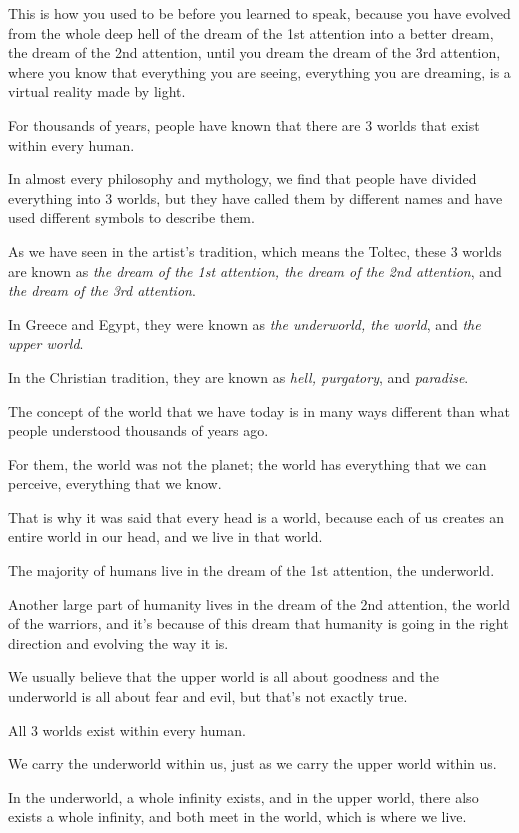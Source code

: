 \documentclass{article}
\numberwithin{equation}{section}
\begin{document}
This is how you used to be before you learned to speak, because you have evolved from the whole deep hell of the dream of the 1st attention into a better dream, the dream of the 2nd attention, until you dream the dream of the 3rd attention, where you know that everything you are seeing, everything you are dreaming, is a virtual reality made by light.

%
For thousands of years, people have known that there are 3 worlds that exist within every human.

In almost every philosophy and mythology, we find that people have divided everything into 3 worlds, but they have called them by different names and have used different symbols to describe them.

As we have seen  in the artist's tradition, which means the Toltec, these 3 worlds are known as \textit{the dream of the 1st attention, the dream of the 2nd attention}, and \textit{the dream of the 3rd attention}.

In Greece and Egypt, they were known as \textit{the underworld, the world}, and \textit{the upper world}.

In the Christian tradition, they are known as \textit{hell, purgatory}, and \textit{paradise}.

%
The concept of the world that we have today is in many ways different than what people understood thousands of years ago.

For them, the world was not the planet; the world has everything that we can perceive, everything that we know.

That is why it was said that every head is a world, because each of us creates an entire world in our head, and we live in that world.

The majority of humans live in the dream of the 1st attention, the underworld.

Another large part of humanity lives in the dream of the 2nd attention, the world of the warriors, and it's because of this dream that humanity is going in the right direction and evolving the way it is.

%
We usually believe that the upper world is all about goodness and the underworld is all about fear and evil, but that's not exactly true.

All 3 worlds exist within every human.

We carry the underworld within us, just as we carry the upper world within us.

In the underworld, a whole infinity exists, and in the upper world, there also exists a whole infinity, and both meet in the world, which is where we live.
\end{document}
